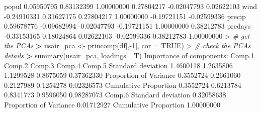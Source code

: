 \documentclass[
]{article}
\newenvironment{Shaded}{\begin{snugshade}}{\end{snugshade}}
\newcommand{\AttributeTok}[1]{\textcolor[rgb]{0.77,0.63,0.00}{#1}}
\newcommand{\CommentTok}[1]{\textcolor[rgb]{0.56,0.35,0.01}{\textit{#1}}}
\newcommand{\ConstantTok}[1]{\textcolor[rgb]{0.00,0.00,0.00}{#1}}
\newcommand{\DecValTok}[1]{\textcolor[rgb]{0.00,0.00,0.81}{#1}}
\newcommand{\ErrorTok}[1]{\textcolor[rgb]{0.64,0.00,0.00}{\textbf{#1}}}
\newcommand{\FloatTok}[1]{\textcolor[rgb]{0.00,0.00,0.81}{#1}}
\newcommand{\FunctionTok}[1]{\textcolor[rgb]{0.00,0.00,0.00}{#1}}
\newcommand{\NormalTok}[1]{#1}
\newcommand{\OtherTok}[1]{\textcolor[rgb]{0.56,0.35,0.01}{#1}}
\newcommand{\SpecialCharTok}[1]{\textcolor[rgb]{0.00,0.00,0.00}{#1}}
\begin{document}
\begin{Shaded}
\begin{Highlighting}[]
\NormalTok{popul    }\FloatTok{0.05950795}  \FloatTok{0.83132399}  \FloatTok{1.00000000}  \FloatTok{0.27804217} \SpecialCharTok{{-}}\FloatTok{0.02047793}  \FloatTok{0.02622103}
\NormalTok{wind    }\SpecialCharTok{{-}}\FloatTok{0.24910331}  \FloatTok{0.31627175}  \FloatTok{0.27804217}  \FloatTok{1.00000000} \SpecialCharTok{{-}}\FloatTok{0.19721151} \SpecialCharTok{{-}}\FloatTok{0.02599336}
\NormalTok{precip   }\FloatTok{0.59678776} \SpecialCharTok{{-}}\FloatTok{0.09682994} \SpecialCharTok{{-}}\FloatTok{0.02047793} \SpecialCharTok{{-}}\FloatTok{0.19721151}  \FloatTok{1.00000000}  \FloatTok{0.38212783}
\NormalTok{predays }\SpecialCharTok{{-}}\FloatTok{0.33153165}  \FloatTok{0.18024864}  \FloatTok{0.02622103} \SpecialCharTok{{-}}\FloatTok{0.02599336}  \FloatTok{0.38212783}  \FloatTok{1.00000000}
\SpecialCharTok{\textgreater{}} \CommentTok{\# get the PCAs}
\ErrorTok{\textgreater{}}\NormalTok{ usair\_pca }\OtherTok{\textless{}{-}} \FunctionTok{princomp}\NormalTok{(df[,}\SpecialCharTok{{-}}\DecValTok{1}\NormalTok{], }\AttributeTok{cor =} \ConstantTok{TRUE}\NormalTok{)}
\SpecialCharTok{\textgreater{}} \CommentTok{\# check the PCAs\textquotesingle{} details}
\ErrorTok{\textgreater{}} \FunctionTok{summary}\NormalTok{(usair\_pca, }\AttributeTok{loadings =}\NormalTok{T)}
\NormalTok{Importance of components}\SpecialCharTok{:}
\NormalTok{                          Comp}\FloatTok{.1}\NormalTok{    Comp}\FloatTok{.2}\NormalTok{    Comp}\FloatTok{.3}\NormalTok{    Comp}\FloatTok{.4}\NormalTok{     Comp}\FloatTok{.5}
\NormalTok{Standard deviation     }\FloatTok{1.4600118} \FloatTok{1.2635806} \FloatTok{1.1299528} \FloatTok{0.8675059} \FloatTok{0.37362330}
\NormalTok{Proportion of Variance }\FloatTok{0.3552724} \FloatTok{0.2661060} \FloatTok{0.2127989} \FloatTok{0.1254278} \FloatTok{0.02326573}
\NormalTok{Cumulative Proportion  }\FloatTok{0.3552724} \FloatTok{0.6213784} \FloatTok{0.8341773} \FloatTok{0.9596050} \FloatTok{0.98287073}
\NormalTok{                           Comp}\FloatTok{.6}
\NormalTok{Standard deviation     }\FloatTok{0.32058638}
\NormalTok{Proportion of Variance }\FloatTok{0.01712927}
\NormalTok{Cumulative Proportion  }\FloatTok{1.00000000}


\end{Highlighting}
\end{Shaded}
\end{document}
